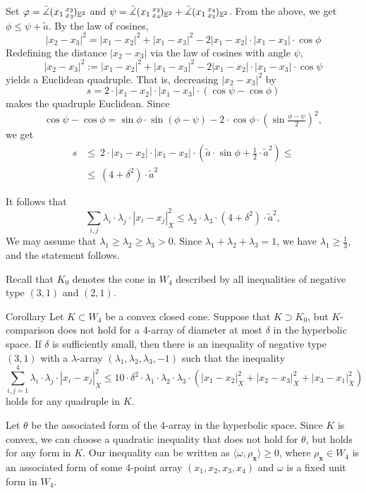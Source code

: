 \documentclass[a4paper,10pt]{article}
\begin{document}
Set $\varphi=\tilde\measuredangle(x_1\,{}^{x_2}_{x_3}\hspace{-0.2ex})_{\mathbb{E}^2}$ and $\psi=\tilde\measuredangle(x_1\,{}^{x_2}_{x_4}\hspace{-0.2ex})_{\mathbb{E}^2}+\tilde\measuredangle(x_1\,{}^{x_4}_{x_3}\hspace{-0.2ex})_{\mathbb{E}^2}$.
From the above, we get $\phi\le \psi+\tilde a$.
By the law of cosines,
\[|x_2-x_3|^2=|x_1-x_2|^2+ |x_1-x_3|^2-2|x_1-x_2|\cdot|x_1-x_3|\cdot\cos\phi\]
Redefining the distance $|x_2-x_3|$ via the law of cosines with angle $\psi$,
\[|x_2-x_3|^2\mathrel{:=}|x_1-x_2|^2+ |x_1-x_3|^2-2|x_1-x_2|\cdot|x_1-x_3|\cdot\cos\psi\]
yields a Euclidean quadruple.
That is, decreasing $|x_2-x_3|^2$ by
\[s=2\cdot |x_1-x_2|\cdot|x_1-x_3|\cdot(\cos\psi-\cos\phi)\]
makes the quadruple Euclidean.
Since
\[\cos\psi-\cos\phi=\sin\phi\cdot\sin(\phi-\psi)-2\cdot\cos\phi\cdot (\sin\tfrac{\phi-\psi}2)^2,\] we get
\begin{align*}
s
&\le\
2\cdot|x_1-x_2|\cdot|x_1-x_3|\cdot (\tilde a\cdot\sin\phi+\tfrac12\cdot\tilde a^2)
\le
\\
&\le\ (4+\delta^2)\cdot \tilde a^2
\end{align*}

It follows that
\[\sum_{i,j}\lambda_i\cdot\lambda_j\cdot|x_i-x_j|_X^2\le \lambda_2\cdot\lambda_3\cdot(4+\delta^2)\cdot \tilde a^2,\]
We may assume that $\lambda_1\ge \lambda_2\ge \lambda_3>0$.
Since $\lambda_1+ \lambda_2+ \lambda_3=1$, we have $\lambda_1\ge \tfrac13$, and the statement follows.
\qeds

Recall that $K_0$ denotes the cone in $W_4$ described by all inequalities of negative type $(3,1)$ and $(2,1)$.

\begin{thm}{Corollary}\label{cor:squared-sides}
Let $K\subset W_4$ be a convex closed cone.
Suppose that $K\supset K_0$, but $K$-comparison does not hold for a 4-array of diameter at most $\delta$ in the hyperbolic space.
If $\delta$ is sufficiently small,
then there is an inequality of negative type $(3,1)$ with a $\lambda$-array $(\lambda_1,\lambda_2,\lambda_3,-1)$ such that the inequality
\[\sum_{i,j=1}^4\lambda_i\cdot\lambda_j\cdot|x_i-x_j|_X^2
\le
10\cdot\delta^2\cdot \lambda_1\cdot\lambda_2\cdot\lambda_3\cdot (|x_1-x_2|_X^2+|x_2-x_3|_X^2+|x_3-x_1|_X^2)\]
holds for any quadruple in $K$.
\end{thm}

Let $\theta$ be the associated form of the 4-array in the hyperbolic space.
Since $K$ is convex, we can choose a quadratic inequality that does not hold for $\theta$, but holds for any form in $K$.
Our inequality can be written as $\langle \omega,\rho_{\bm{x}} \rangle\ge 0$, where $\rho_{\bm{x}}\in W_4$ is an associated form of some 4-point array $(x_1,x_2,x_3,x_4)$ and $\omega$ is a fixed unit form in $W_4$.
\end{document}
